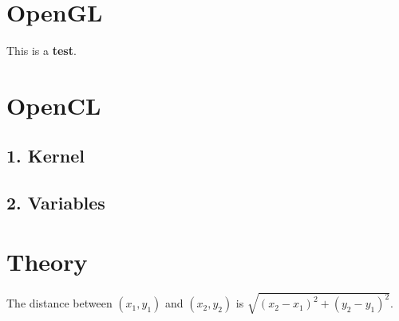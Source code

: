 \hypertarget{doc_doc_opengl}{}\section{Open\+GL}\label{doc_doc_opengl}
This is a {\bfseries test}.\hypertarget{doc_doc_opencl}{}\section{Open\+CL}\label{doc_doc_opencl}
\hypertarget{doc_doc_opencl_kernel}{}\subsection{1. Kernel}\label{doc_doc_opencl_kernel}
\hypertarget{doc_doc_opencl_variables}{}\subsection{2. Variables}\label{doc_doc_opencl_variables}
\hypertarget{doc_doc_theory}{}\section{Theory}\label{doc_doc_theory}
The distance between $(x_1,y_1)$ and $(x_2,y_2)$ is $\sqrt{(x_2-x_1)^2+(y_2-y_1)^2}$. 